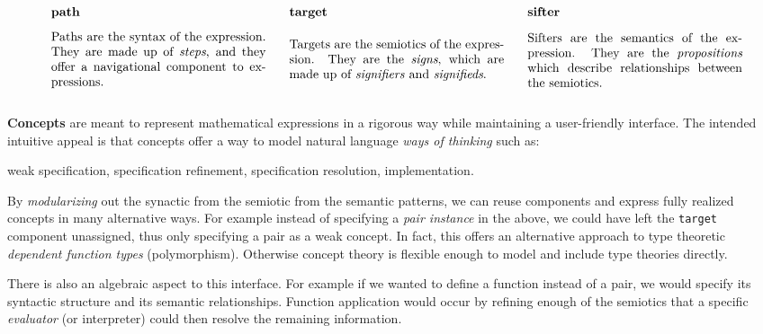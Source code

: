 \documentclass[twoside]{article}
\newcommand{\strong}[1]{{\bfseries #1}}
\newcommand{\bfmbox}[1]{\mbox{\bfseries #1}}
\newcommand{\tab}[1][1.125cm]{\hspace{#1}}
\newcommand{\col}[1][0ex]{& \hspace{#1}}
\begin{document}
$$ \def\arraystretch{1.2}
\tab[1ex] \begin{array}{lll}
\bfmbox{path}		\col[2ex] \bfmbox{target}	\col[2ex] \bfmbox{sifter}		\\[2ex]

\parbox{6cm}{
Paths are the syntax of the expression. They are made up of \emph{steps}, and they offer a navigational component to expressions.
} \col[2ex] \parbox{6cm}{
Targets are the semiotics of the expression. They are the \emph{signs}, which are made up of \emph{signifiers} and \emph{signifieds}.
} \col[2ex] \parbox{6cm}{
Sifters are the semantics of the expression. They are the \emph{propositions} which describe relationships between the semiotics.
}

\end{array} $$
\ \\[-3ex]

\strong{Concepts} are meant to represent mathematical expressions in a rigorous way while maintaining a user-friendly interface.
The intended intuitive appeal is that concepts offer a way to model natural language \emph{ways of thinking} such as:
\begin{center}
weak specification, specification refinement, specification resolution, implementation.
\end{center}
By \emph{modularizing} out the synactic from the semiotic from the semantic patterns, we can reuse components and express
fully realized concepts in many alternative ways. For example instead of specifying a \emph{pair instance} in the above,
we could have left the \texttt{target} component unassigned, thus only specifying a pair as a weak concept. In fact,
this offers an alternative approach to type theoretic \emph{dependent function types} (polymorphism). Otherwise
concept theory is flexible enough to model and include type theories directly.

There is also an algebraic aspect to this interface. For example if we wanted to define a function instead of a pair,
we would specify its syntactic structure and its semantic relationships. Function application would occur by refining
enough of the semiotics that a specific \emph{evaluator} (or interpreter) could then resolve the remaining information.



\ \\[0.5cm]
\end{document}
